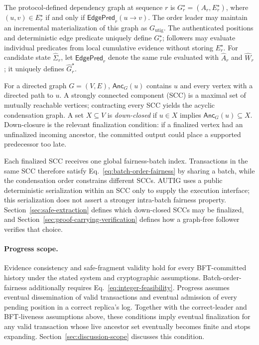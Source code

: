 The protocol-defined dependency graph at sequence $r$ is
$G_r^\star=(A_r,E_r^\star)$, where
$(u,v)\in E_r^\star$ if and only if
$\mathsf{EdgePred}_r(u\to v)$.  The order leader may maintain an incremental
materialization of this graph as $G_{\mathrm{utig}}$.  The authenticated
positions and deterministic edge predicate uniquely define $G_r^\star$;
followers may evaluate individual predicates from local cumulative evidence
without storing $E_r^\star$.
For candidate state $\widehat\Sigma_r$, let
$\widehat{\mathsf{EdgePred}}_r$ denote the same rule evaluated with
$\widehat A_r$ and $\widehat W_r$; it uniquely defines
$\widehat G_r^\star$.

For a directed graph $G=(V,E)$, $\mathsf{Anc}_G(u)$ contains $u$ and every
vertex with a directed path to $u$.  A strongly connected component (SCC) is a
maximal set of mutually reachable vertices; contracting every SCC yields the
acyclic condensation graph.  A set $X\subseteq V$ is \emph{down-closed} if
$u\in X$ implies $\mathsf{Anc}_G(u)\subseteq X$.  Down-closure is the relevant
finalization condition: if a finalized vertex had an unfinalized incoming
ancestor, the committed output could place a supported predecessor too late.

Each finalized SCC receives one global fairness-batch index.  Transactions in
the same SCC therefore satisfy Eq.~\eqref{eq:batch-order-fairness} by sharing a
batch, while the condensation order constrains different SCCs.  AUTIG uses a
public deterministic serialization within an SCC only to supply the execution
interface; this serialization does not assert a stronger intra-batch fairness
property.  Section~\ref{sec:safe-extraction} defines which down-closed SCCs may
be finalized, and Section~\ref{sec:proof-carrying-verification} defines how a
graph-free follower verifies that choice.

\paragraph{Progress scope.}
Evidence consistency and safe-fragment validity hold for every BFT-committed
history under the stated system and cryptographic assumptions.
Batch-order-fairness additionally requires
Eq.~\eqref{eq:integer-feasibility}.  Progress assumes eventual dissemination
of valid transactions and eventual admission of every pending position in a
correct replica's log.  Together with the correct-leader and BFT-liveness
assumptions above, these conditions imply eventual finalization for any valid
transaction whose live ancestor set eventually becomes finite and stops
expanding.  Section~\ref{sec:discussion-scope} discusses this condition.

